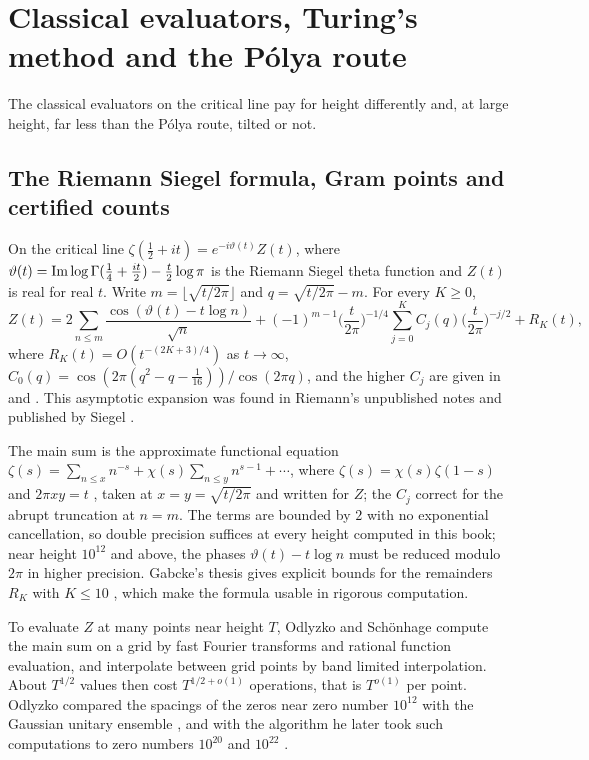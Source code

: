 \section{Classical evaluators, Turing's method and the P\'olya route}\label{ch:classical}

The classical evaluators on the critical line pay for height differently and, at large height, far less than the P\'olya route, tilted or not.

\subsection{The Riemann Siegel formula, Gram points and certified counts}\label{sec:ch5:turing}

On the critical line $\zeta(\frac12+it)=e^{-i\vartheta(t)}Z(t)$, where $\vartheta(t)=\operatorname{Im}\log\Gamma(\frac14+\frac{it}2)-\frac t2\log\pi$ is the Riemann Siegel theta function and $Z(t)$ is real for real $t$. Write $m=\lfloor\sqrt{t/2\pi}\rfloor$ and $q=\sqrt{t/2\pi}-m$. For every $K\ge0$,
\[
Z(t)=2\sum_{n\le m}\frac{\cos(\vartheta(t)-t\log n)}{\sqrt n}+(-1)^{m-1}\Big(\frac t{2\pi}\Big)^{-1/4}\sum_{j=0}^{K}C_j(q)\Big(\frac t{2\pi}\Big)^{-j/2}+R_K(t),
\]
where $R_K(t)=O(t^{-(2K+3)/4})$ as $t\to\infty$, $C_0(q)=\cos(2\pi(q^2-q-\frac1{16}))/\cos(2\pi q)$, and the higher $C_j$ are given in \cite[Section 7.5]{Edwards} and \cite{Gabcke79}. This asymptotic expansion was found in Riemann's unpublished notes and published by Siegel \cite{Siegel32}.

The main sum is the approximate functional equation $\zeta(s)=\sum_{n\le x}n^{-s}+\chi(s)\sum_{n\le y}n^{s-1}+\cdots$, where $\zeta(s)=\chi(s)\zeta(1-s)$ and $2\pi xy=t$ \cite[Chapter 4]{Titchmarsh}, taken at $x=y=\sqrt{t/2\pi}$ and written for $Z$; the $C_j$ correct for the abrupt truncation at $n=m$. The terms are bounded by $2$ with no exponential cancellation, so double precision suffices at every height computed in this book; near height $10^{12}$ and above, the phases $\vartheta(t)-t\log n$ must be reduced modulo $2\pi$ in higher precision. Gabcke's thesis gives explicit bounds for the remainders $R_K$ with $K\le10$ \cite{Gabcke79}, which make the formula usable in rigorous computation.

To evaluate $Z$ at many points near height $T$, Odlyzko and Sch\"onhage \cite{OS88} compute the main sum on a grid by fast Fourier transforms and rational function evaluation, and interpolate between grid points by band limited interpolation. About $T^{1/2}$ values then cost $T^{1/2+o(1)}$ operations, that is $T^{o(1)}$ per point. Odlyzko compared the spacings of the zeros near zero number $10^{12}$ with the Gaussian unitary ensemble \cite{Odlyzko87}, and with the algorithm he later took such computations to zero numbers $10^{20}$ \cite{Odlyzko92} and $10^{22}$ \cite{Odlyzko01}.

